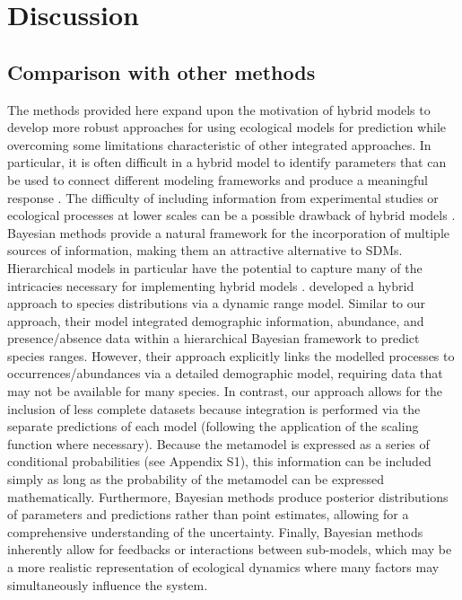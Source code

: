 \documentclass[11pt]{article}
\begin{document}
%
%



\section*{Discussion}

\subsection*{Comparison with other methods}
The methods provided here expand upon the motivation of hybrid models to develop more robust approaches for using ecological models for prediction while overcoming some limitations characteristic of other integrated approaches.
In particular, it is often difficult in a hybrid model to identify parameters that can be used to connect different modeling frameworks and produce a meaningful response \citep{Thuiller2013}. 
The difficulty of including information from experimental studies or ecological processes at lower scales can be a possible drawback of hybrid models \citep{Smolik2010, Thuiller2014a}. 
Bayesian methods provide a natural framework for the incorporation of multiple sources of information, making them an attractive alternative to SDMs.
Hierarchical models in particular have the potential to capture many of the intricacies necessary for implementing hybrid models \citep{Latimer2006}.
\citet{Pagel2012} developed a hybrid approach to species distributions via a dynamic range model.
Similar to our approach, their model integrated demographic information, abundance, and presence/absence data within a hierarchical Bayesian framework to predict species ranges.
However, their approach explicitly links the modelled processes to occurrences/abundances via a detailed demographic model, requiring data that may not be available for many species.
In contrast, our approach allows for the inclusion of less complete datasets because integration is performed via the separate predictions of each model (following the application of the scaling function where necessary).
Because the metamodel is expressed as a series of conditional probabilities (see Appendix S1), this information can be included simply as long as the probability of the metamodel can be expressed mathematically.
Furthermore, Bayesian methods produce posterior distributions of parameters and predictions rather than point estimates, allowing for a comprehensive understanding of the uncertainty. 
Finally, Bayesian methods inherently allow for feedbacks or interactions between sub-models, which may be a more realistic representation of ecological dynamics where many factors may simultaneously influence the system.
\end{document}
